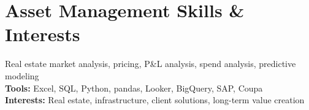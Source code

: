 \documentclass[11pt,a4paper,sans]{moderncv} %
\makeatletter
\newcommand*{\customcventry}[5][0.8em]{
  \begin{tabular}{@{}l}
    \fontsize{12}{12}{\bfseries #2}, {\itshape #3}
  \end{tabular}
  \hfill%
  \begin{tabular}{l@{}}
    \fontsize{12}{12}{\itshape #4}
  \end{tabular}
  \ifx&#5&%
  \else{
    \par\addvspace{0.15em}
    \begin{minipage}{\maincolumnwidth}%
      #5%
    \end{minipage}}\fi%
  \par\addvspace{#1}}
\newcommand*{\customcawards}[4]{
  \begin{tabular}{@{}l}
    {#2}
  \end{tabular}
  \hfill%
  \begin{tabular}{l@{}}
      \bfseries \itshape #3
  \end{tabular}
  \ifx&#4&%
  \else{\\%
    \begin{minipage}{\maincolumnwidth}%
      #4%
    \end{minipage}}\fi%
  \par\addvspace{#1}}
\makeatother
\begin{document}




\section{Asset Management Skills \& Interests}
 Real estate market analysis, pricing, P\&L analysis, spend analysis, predictive modeling\\
{\bfseries Tools:} Excel, SQL, Python, pandas, Looker, BigQuery, SAP, Coupa\\
{\bfseries Interests:} Real estate, infrastructure, client solutions, long-term value creation

\end{document}
